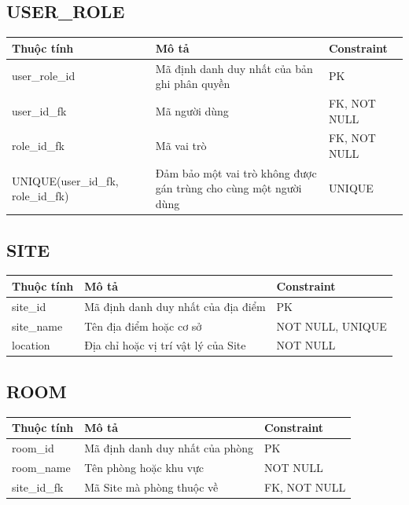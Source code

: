 \subsection{USER\_ROLE}
\begin{center}
\begin{longtable}{|>{\raggedright\arraybackslash}p{4.5cm}|>{\raggedright\arraybackslash}p{5.5cm}|>{\raggedright\arraybackslash}p{4.5cm}|}
\hline
\textbf{Thuộc tính} & \textbf{Mô tả} & \textbf{Constraint} \\ \hline
\endhead
user\_role\_id & Mã định danh duy nhất của bản ghi phân quyền & PK \\ \hline
user\_id\_fk & Mã người dùng & FK, NOT NULL \\ \hline
role\_id\_fk & Mã vai trò & FK, NOT NULL \\ \hline
UNIQUE(user\_id\_fk, role\_id\_fk) & Đảm bảo một vai trò không được gán trùng cho cùng một người dùng & UNIQUE \\ \hline
\end{longtable}
\end{center}

\subsection{SITE}
\begin{center}
\begin{longtable}{|>{\raggedright\arraybackslash}p{3.5cm}|>{\raggedright\arraybackslash}p{6.5cm}|>{\raggedright\arraybackslash}p{4.5cm}|}
\hline
\textbf{Thuộc tính} & \textbf{Mô tả} & \textbf{Constraint} \\ \hline
\endhead
site\_id & Mã định danh duy nhất của địa điểm & PK \\ \hline
site\_name & Tên địa điểm hoặc cơ sở & NOT NULL, UNIQUE \\ \hline
location & Địa chỉ hoặc vị trí vật lý của Site & NOT NULL \\ \hline
\end{longtable}
\end{center}

\subsection{ROOM}
\begin{center}
\begin{longtable}{|>{\raggedright\arraybackslash}p{3.5cm}|>{\raggedright\arraybackslash}p{6.5cm}|>{\raggedright\arraybackslash}p{4.5cm}|}
\hline
\textbf{Thuộc tính} & \textbf{Mô tả} & \textbf{Constraint} \\ \hline
\endhead
room\_id & Mã định danh duy nhất của phòng & PK \\ \hline
room\_name & Tên phòng hoặc khu vực & NOT NULL \\ \hline
site\_id\_fk & Mã Site mà phòng thuộc về & FK, NOT NULL \\ \hline
\end{longtable}
\end{center}

